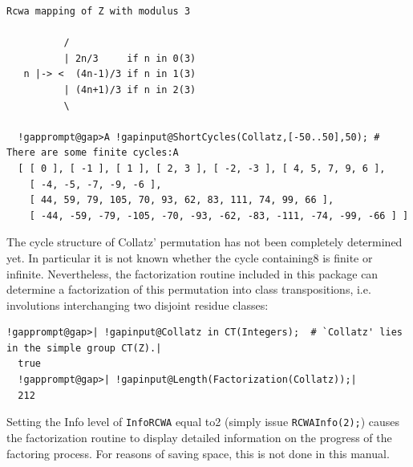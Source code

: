 \documentclass[a4paper,11pt]{report}
\begin{document}
{{\begin{Verbatim}[commandchars=!@A,fontsize=\small,frame=single,label=Example]
  Rcwa mapping of Z with modulus 3
  
          /
          | 2n/3     if n in 0(3)
   n |-> <  (4n-1)/3 if n in 1(3)
          | (4n+1)/3 if n in 2(3)
          \
  
  !gapprompt@gap>A !gapinput@ShortCycles(Collatz,[-50..50],50); # There are some finite cycles:A
  [ [ 0 ], [ -1 ], [ 1 ], [ 2, 3 ], [ -2, -3 ], [ 4, 5, 7, 9, 6 ], 
    [ -4, -5, -7, -9, -6 ], 
    [ 44, 59, 79, 105, 70, 93, 62, 83, 111, 74, 99, 66 ], 
    [ -44, -59, -79, -105, -70, -93, -62, -83, -111, -74, -99, -66 ] ]
\end{Verbatim}
 The cycle structure of Collatz' permutation has not been completely determined
yet. In particular it is not known whether the cycle
containing{\nobreakspace}8 is finite or infinite. Nevertheless, the
factorization routine included in this package can determine a factorization
of this permutation into class transpositions, i.e. involutions interchanging
two disjoint residue classes: 
\begin{Verbatim}[commandchars=!@|,fontsize=\small,frame=single,label=Example]
  !gapprompt@gap>| !gapinput@Collatz in CT(Integers);  # `Collatz' lies in the simple group CT(Z).|
  true
  !gapprompt@gap>| !gapinput@Length(Factorization(Collatz));|
  212
\end{Verbatim}
 Setting the Info level of \texttt{InfoRCWA} equal to{\nobreakspace}2 (simply issue \texttt{RCWAInfo(2);}) causes the factorization routine to display detailed information on the
progress of the factoring process. For reasons of saving space, this is not
done in this manual. 

}}
\end{document}
